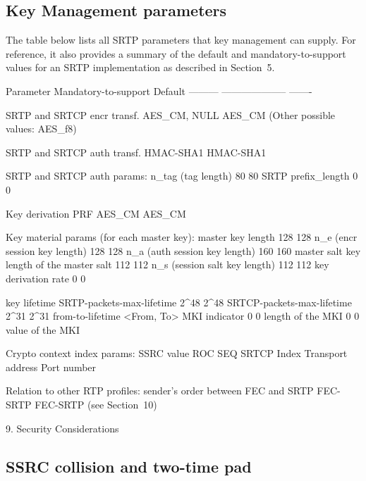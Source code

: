 \documentclass{article}
\begin{document}
\subsection{Key Management parameters}

The table below lists all SRTP parameters that key management can supply.  For reference, it also provides a summary of the default and mandatory-to-support values for an SRTP implementation as described in Section~5.

Parameter                     Mandatory-to-support    Default ---------                     --------------------    -------

SRTP and SRTCP encr transf.       AES\_CM, NULL         AES\_CM (Other possible values: AES\_f8)

SRTP and SRTCP auth transf.       HMAC-SHA1           HMAC-SHA1

SRTP and SRTCP auth params: n\_tag (tag length)                 80                 80 SRTP prefix\_length                  0                  0

Key derivation PRF                 AES\_CM              AES\_CM

Key material params (for each master key): master key length                 128                128 n\_e (encr session key length)     128                128 n\_a (auth session key length)     160                160 master salt key length of the master salt         112                112 n\_s (session salt key length)     112                112 key derivation rate                 0                  0

key lifetime SRTP-packets-max-lifetime      2\textasciicircum{}48               2\textasciicircum{}48 SRTCP-packets-max-lifetime     2\textasciicircum{}31               2\textasciicircum{}31 from-to-lifetime <From, To> MKI indicator                       0                 0 length of the MKI                   0                 0 value of the MKI

Crypto context index params: SSRC value ROC SEQ SRTCP Index Transport address Port number

Relation to other RTP profiles: sender's order between FEC and SRTP FEC-SRTP      FEC-SRTP (see Section~10)

9. Security Considerations

\subsection{SSRC collision and two-time pad}
\end{document}
